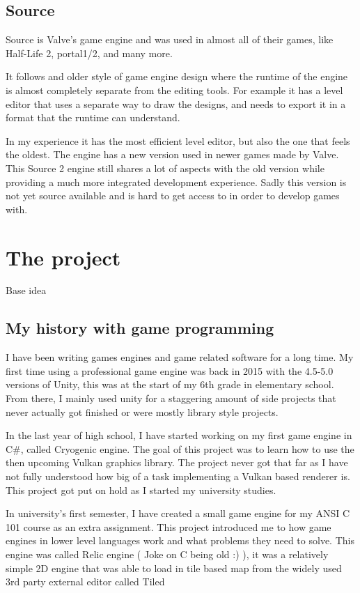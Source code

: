 \subsection{Source}

Source is Valve's game engine and was used in almost all of their games, like Half-Life 2, portal1/2, and many more.

It follows and older style of game engine design where the runtime of the engine is almost completely separate from the editing tools. For example it has a level editor that uses a separate way to draw the designs, and needs to export it in a format that the runtime can understand.

In my experience it has the most efficient level editor, but also the one that feels the oldest. The engine has a new version used in newer games made by Valve. This Source 2 engine still shares a lot of aspects with the old version while providing a much more integrated development experience. Sadly this version is not yet source available and is hard to get access to in order to develop games with.


\section{The project}

Base idea

\subsection{My history with game programming}
I have been writing games engines and game related software for a long time.
My first time using a professional game engine was back in 2015 with the 4.5-5.0 versions of Unity, this was at the start of my 6th grade in elementary school. From there, I mainly used unity for a staggering amount of side projects that never actually got finished or were mostly library style projects. 

In the last year of high school, I have started working on my first game engine in C\#, called Cryogenic engine.
The goal of this project was to learn how to use the then upcoming Vulkan graphics library.
The project never got that far as I have not fully understood how big of a task implementing a Vulkan based renderer is.
This project got put on hold as I started my university studies.

In university's first semester, I have created a small game engine for my ANSI C 101 course as an extra assignment.
This project introduced me to how game engines in lower level languages work and what problems they need to solve.
This engine was called Relic engine ( Joke on C being old :) ),
it was a relatively simple 2D engine that was able to load in tile based map from the widely used 3rd party external editor called Tiled \cite{tiled}

